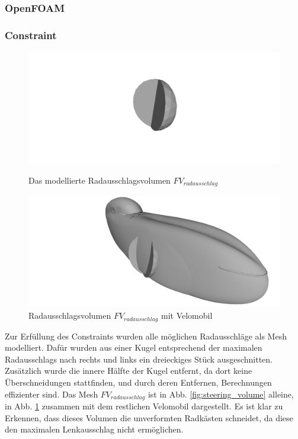 \subsubsection{OpenFOAM}


\subsubsection{Constraint}
\begin{figure}[h]
	\centering
	\begin{minipage}{0.45\textwidth}
		\centering
		\includegraphics[width=1\linewidth]{bilder/radausschlag.png}
		\caption{Das modellierte Radausschlagsvolumen $FV_{radausschlag}$}
		\label{fig:steering_volume}
	\end{minipage}\hfill
	\begin{minipage}{0.45\textwidth}
		\centering
		\includegraphics[width=1\linewidth]{bilder/radausschlag_inclVelo.png}
		\caption{Radausschlagsvolumen $FV_{radausschlag}$ mit Velomobil}
		\label{fig:steering_volume_with_velo}
	\end{minipage}
\end{figure}
Zur Erfüllung des Constraints wurden alle möglichen Radausschläge als Mesh modelliert.
Dafür wurden aus einer Kugel entsprechend der maximalen Radausschlags nach rechts und links ein dreieckiges Stück ausgeschnitten.
Zusätzlich wurde die innere Hälfte der Kugel entfernt, da dort keine Überschneidungen stattfinden, und durch deren Entfernen, Berechnungen effizienter sind.
Das Mesh $FV_{radausschlag}$ ist in Abb. \ref{fig:steering_volume} alleine, in Abb. \ref{fig:steering_volume_with_velo} zusammen mit dem restlichen Velomobil dargestellt.
Es ist klar zu Erkennen, dass dieses Volumen die unverformten Radkästen schneidet, da diese den maximalen Lenkausschlag nicht ermöglichen.
 

